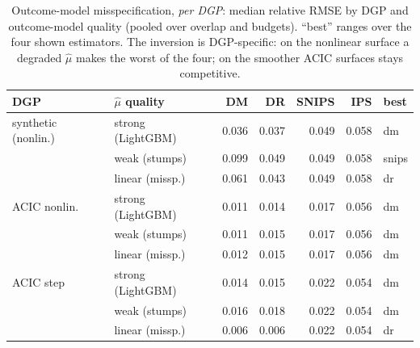 \begin{table}[t]\centering
\caption{Outcome-model misspecification, \emph{per DGP}: median relative RMSE by DGP and outcome-model quality (pooled over overlap and budgets). ``best'' ranges over the four shown estimators. The inversion is DGP-specific: on the nonlinear  surface a degraded $\hat\mu$ makes  the worst of the four; on the smoother ACIC surfaces  stays competitive.}
\label{tab:misspec}
\begin{tabular}{llrrrrl}
\toprule
DGP & $\hat\mu$ quality & DM & DR & SNIPS & IPS & best \\
\midrule
synthetic (nonlin.) & strong (LightGBM) & 0.036 & 0.037 & 0.049 & 0.058 & dm \\
 & weak (stumps) & 0.099 & 0.049 & 0.049 & 0.058 & snips \\
 & linear (missp.) & 0.061 & 0.043 & 0.049 & 0.058 & dr \\
\midrule
ACIC nonlin. & strong (LightGBM) & 0.011 & 0.014 & 0.017 & 0.056 & dm \\
 & weak (stumps) & 0.011 & 0.015 & 0.017 & 0.056 & dm \\
 & linear (missp.) & 0.012 & 0.015 & 0.017 & 0.056 & dm \\
\midrule
ACIC step & strong (LightGBM) & 0.014 & 0.015 & 0.022 & 0.054 & dm \\
 & weak (stumps) & 0.016 & 0.018 & 0.022 & 0.054 & dm \\
 & linear (missp.) & 0.006 & 0.006 & 0.022 & 0.054 & dr \\
\bottomrule
\end{tabular}
\end{table}